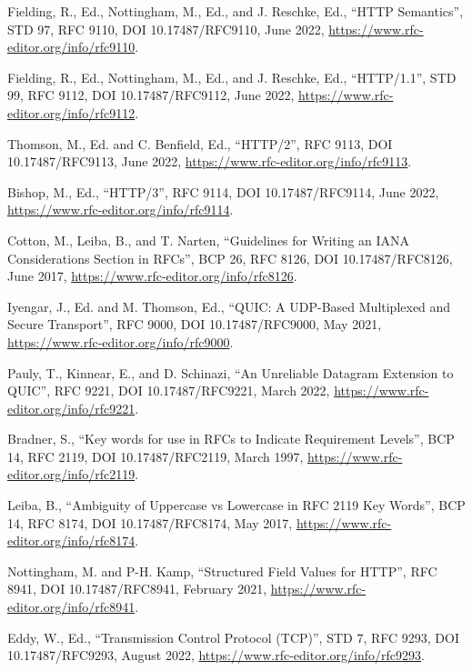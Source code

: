 \documentclass{article}
\begin{document}
\begin{description}[style=unboxed, leftmargin=1cm]
\item[{[HTTP]}] Fielding, R., Ed., Nottingham, M., Ed., and J. Reschke,
   Ed., ``HTTP Semantics'', STD 97, RFC 9110,
   DOI 10.17487/RFC9110, June 2022,
   \url{https://www.rfc-editor.org/info/rfc9110}.

\item[{[HTTP/1.1]}] Fielding, R., Ed., Nottingham, M., Ed., and J. Reschke,
   Ed., ``HTTP/1.1'', STD 99, RFC 9112, DOI 10.17487/RFC9112,
   June 2022, \url{https://www.rfc-editor.org/info/rfc9112}.

\item[{[HTTP/2]}] Thomson, M., Ed. and C. Benfield, Ed., ``HTTP/2'', RFC 9113,
   DOI 10.17487/RFC9113, June 2022,
   \url{https://www.rfc-editor.org/info/rfc9113}.

\item[{[HTTP/3]}] Bishop, M., Ed., ``HTTP/3'', RFC 9114, DOI 10.17487/RFC9114,
   June 2022, \url{https://www.rfc-editor.org/info/rfc9114}.

\item[{[IANA-POLICY]}] Cotton, M., Leiba, B., and T. Narten, ``Guidelines for
   Writing an IANA Considerations Section in RFCs'', BCP 26,
   RFC 8126, DOI 10.17487/RFC8126, June 2017,
   \url{https://www.rfc-editor.org/info/rfc8126}.

\item[{[QUIC]}] Iyengar, J., Ed. and M. Thomson, Ed., ``QUIC: A UDP-Based
   Multiplexed and Secure Transport'', RFC 9000,
   DOI 10.17487/RFC9000, May 2021,
   \url{https://www.rfc-editor.org/info/rfc9000}.

\item[{[QUIC-DGRAM]}] Pauly, T., Kinnear, E., and D. Schinazi, ``An Unreliable
   Datagram Extension to QUIC'', RFC 9221,
   DOI 10.17487/RFC9221, March 2022,
   \url{https://www.rfc-editor.org/info/rfc9221}.

\item[{[RFC2119]}] Bradner, S., ``Key words for use in RFCs to Indicate
   Requirement Levels'', BCP 14, RFC 2119,
   DOI 10.17487/RFC2119, March 1997,
   \url{https://www.rfc-editor.org/info/rfc2119}.

\item[{[RFC8174]}] Leiba, B., ``Ambiguity of Uppercase vs Lowercase in RFC
   2119 Key Words'', BCP 14, RFC 8174, DOI 10.17487/RFC8174,
   May 2017, \url{https://www.rfc-editor.org/info/rfc8174}.

\item[{[STRUCTURED-FIELDS]}] Nottingham, M. and P-H. Kamp, ``Structured Field Values for
   HTTP'', RFC 8941, DOI 10.17487/RFC8941, February 2021,
   \url{https://www.rfc-editor.org/info/rfc8941}.

\item[{[TCP]}] Eddy, W., Ed., ``Transmission Control Protocol (TCP)'',
   STD 7, RFC 9293, DOI 10.17487/RFC9293, August 2022,
   \url{https://www.rfc-editor.org/info/rfc9293}.
\end{description}
\end{document}
